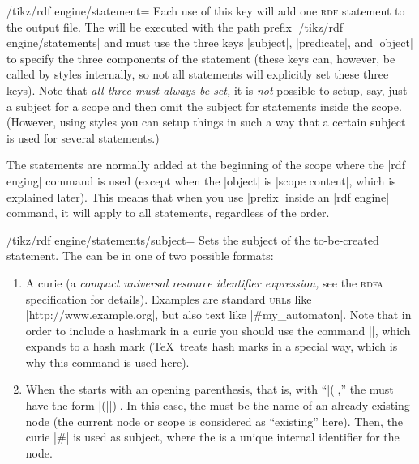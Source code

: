 \begin{key}{/tikz/rdf engine/statement=}
  Each use of this key will add one \textsc{rdf} statement to the
  output file. The  will be executed with the path
  prefix |/tikz/rdf engine/statements| and must use the three keys
  |subject|, |predicate|, and |object| to specify the three components
  of the statement (these keys can, however, be called by styles
  internally, so not all statements will explicitly set these three
  keys). Note that \emph{all three must always be set,} 
  it is \emph{not} possible to setup, say, just a subject for a scope
  and then omit the subject for statements inside the scope. (However,
  using styles you can setup things in such a way that a
  certain subject is used for several statements.)

\begin{codeexample}
\end{codeexample}

  The statements are normally  added at the beginning of the
  scope where the |rdf enging| command is used (except when the
  |object| is |scope content|, which is explained later). This
  means that when you use |prefix| inside an |rdf engine| command, it
  will apply to all statements, regardless of the order.

 \begin{key}{/tikz/rdf engine/statements/subject=}
    Sets the subject of the to-be-created statement. The
     can be in one of two possible formats:
    \begin{enumerate}
    \item A curie (a \emph{compact universal resource identifier
        expression,} see the \textsc{rdfa} specification for
      details). Examples are standard \textsc{url}s like
      |http://www.example.org|, but also text like
      |#my_automaton|. Note that in order to include a hashmark in a
      curie you should use the command |\tikzrdfhashmark|, which
      expands to a hash mark (\TeX\ treats hash marks in a special
      way, which is why this command is used here).
    \item When the  starts with an opening parenthesis,
      that is, with ``|(|,'' the  must have the form
      |(||)|. In this case, the  must be the name of an already existing node (the
      current node or scope is considered as ``existing'' here). Then,
      the curie |#| is used as subject,
      where the  is a unique internal identifier for the
      node.


\end{enumerate}
\end{key}
\end{key}
